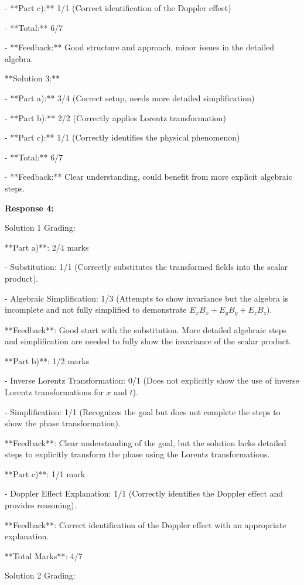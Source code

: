 \documentclass[a4paper,11pt]{article}
\begin{document}
- **Part c):** 1/1 (Correct identification of the Doppler effect)

- **Total:** 6/7

- **Feedback:** Good structure and approach, minor issues in the detailed algebra.

**Solution 3:**

- **Part a):** 3/4 (Correct setup, needs more detailed simplification)

- **Part b):** 2/2 (Correctly applies Lorentz transformation)

- **Part c):** 1/1 (Correctly identifies the physical phenomenon)

- **Total:** 6/7

- **Feedback:** Clear understanding, could benefit from more explicit algebraic steps.

\bigskip
\textbf{Response 4:}

Solution 1 Grading:

**Part a)**: 2/4 marks

- Substitution: 1/1 (Correctly substitutes the transformed fields into the scalar product).

- Algebraic Simplification: 1/3 (Attempts to show invariance but the algebra is incomplete and not fully simplified to demonstrate \( E_x B_x + E_y B_y + E_z B_z \)).

**Feedback**: Good start with the substitution. More detailed algebraic steps and simplification are needed to fully show the invariance of the scalar product.

**Part b)**: 1/2 marks

- Inverse Lorentz Transformation: 0/1 (Does not explicitly show the use of inverse Lorentz transformations for \( x \) and \( t \)).

- Simplification: 1/1 (Recognizes the goal but does not complete the steps to show the phase transformation).

**Feedback**: Clear understanding of the goal, but the solution lacks detailed steps to explicitly transform the phase using the Lorentz transformations.

**Part c)**: 1/1 mark

- Doppler Effect Explanation: 1/1 (Correctly identifies the Doppler effect and provides reasoning).

**Feedback**: Correct identification of the Doppler effect with an appropriate explanation.

**Total Marks**: 4/7

Solution 2 Grading:
\end{document}
